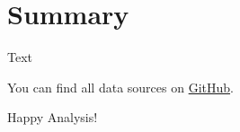 %
%

\pagebreak
\section{Summary}

\onehalfspacing

Text

You can find all data sources on   \href{https://github.com/chfrank-cgn/Rancher/tree/master/az-cluster-1}{GitHub}.

Happy Analysis!
